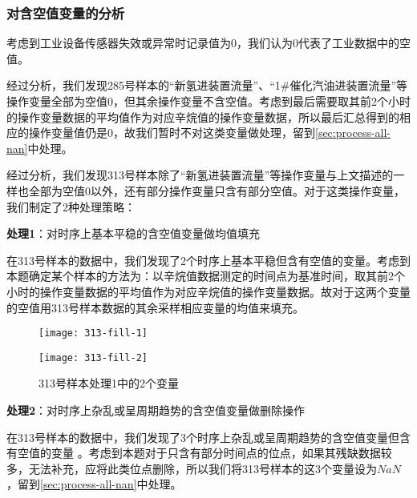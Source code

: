 \documentclass[bwprint]{gmcmthesis}
\begin{document}
%
%


\FloatBarrier
\subsubsection{对含空值变量的分析}\label{sec:empty-analyze}

考虑到工业设备传感器失效或异常时记录值为0，我们认为0代表了工业数据中的空值。

经过分析，我们发现285号样本的“新氢进装置流量”、“1\#催化汽油进装置流量”等操作变量全部为空值0，但其余操作变量不含空值。考虑到最后需要取其前2个小时的操作变量数据的平均值作为对应辛烷值的操作变量数据，所以最后汇总得到的相应的操作变量值仍是0，故我们暂时不对这类变量做处理，留到\ref{sec:process-all-nan}中处理。

经过分析，我们发现313号样本除了“新氢进装置流量”等操作变量与上文描述的一样也全部为空值0以外，还有部分操作变量只含有部分空值。对于这类操作变量，我们制定了2种处理策略：

\textbf{处理1}：对时序上基本平稳的含空值变量做均值填充

在313号样本的数据中，我们发现了2个时序上基本平稳但含有空值的变量。考虑到本题确定某个样本的方法为：以辛烷值数据测定的时间点为基准时间，取其前2个小时的操作变量数据的平均值作为对应辛烷值的操作变量数据。故对于这两个变量的空值用313号样本数据的其余采样相应变量的均值来填充。


\begin{figure}[htb]
    \centering
    \begin{minipage}[c]{0.35\textwidth}
        \centering
        \texttt{[image: 313-fill-1]}
    \end{minipage}
    \begin{minipage}[c]{0.35\textwidth}
        \centering
        \texttt{[image: 313-fill-2]}
    \end{minipage}
    \caption{313号样本处理1中的2个变量}
\end{figure}


\textbf{处理2}：对时序上杂乱或呈周期趋势的含空值变量做删除操作

在313号样本的数据中，我们发现了3个时序上杂乱或呈周期趋势的含空值变量但含有空值的变量 。考虑到本题对于只含有部分时间点的位点，如果其残缺数据较多，无法补充，应将此类位点删除，所以我们将313号样本的这3个变量设为$NaN$，留到\ref{sec:process-all-nan}中处理。
\end{document}

